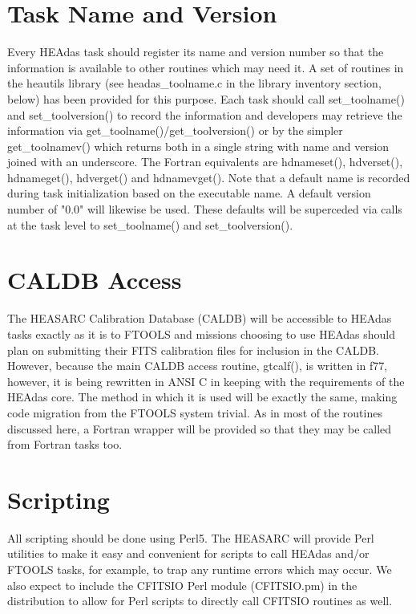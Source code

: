 \documentclass[11pt]{book}
\begin{document}
\section{Task Name and Version}

Every HEAdas task should register its name and version number
so that the information is available to other routines which may
need it. A set of routines in the heautils library (see
headas\_toolname.c in the library inventory section, below) has
been provided for this purpose. Each task should call
set\_toolname() and set\_toolversion() to record the
information and developers may retrieve the information via
get\_toolname()/get\_toolversion() or by the simpler
get\_toolnamev() which returns both in a single string with name
and version joined with an underscore. The Fortran equivalents
are hdnameset(), hdverset(), hdnameget(), hdverget() and
hdnamevget(). Note that a default name is recorded during task
initialization based on the executable name. A default version
number of "0.0" will likewise be used. These defaults will be
superceded via calls at the task level to set\_toolname() and
set\_toolversion().

\section{CALDB Access}

The HEASARC Calibration Database (CALDB) will be
accessible to HEAdas tasks exactly as it is to FTOOLS and
missions choosing to use HEAdas should plan on submitting their
FITS calibration files for inclusion in the CALDB. However,
because the main CALDB access routine, gtcalf(), is written in
f77, however, it is being rewritten in ANSI C in keeping with the
requirements of the HEAdas core. The method in which it is used
will be exactly the same, making code migration from the
FTOOLS system trivial. As in most of the routines discussed
here, a Fortran wrapper will be provided so that they may be
called from Fortran tasks too.

\section{Scripting}
All scripting should be done using Perl5. The HEASARC will
provide Perl utilities to make it easy and convenient for scripts to
call HEAdas and/or FTOOLS tasks, for example, to trap any
runtime errors which may occur. We also expect to include the
CFITSIO Perl module (CFITSIO.pm) in the distribution to allow for
Perl scripts to directly call CFITSIO routines as well.
\end{document}

